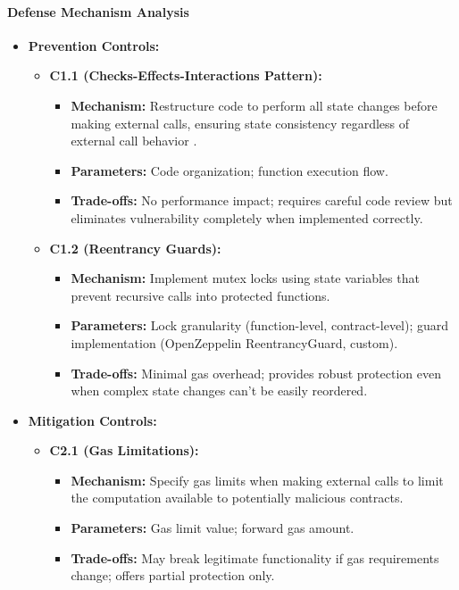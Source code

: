 \paragraph{Defense Mechanism Analysis}

\begin{itemize}
\item \textbf{Prevention Controls:}
    \begin{itemize}
    \item \textbf{C1.1 (Checks-Effects-Interactions Pattern):}
        \begin{itemize}
        \item \textbf{Mechanism:} Restructure code to perform all state changes before making external calls, ensuring state consistency regardless of external call behavior \cite{praitheeshan2019systematic}.
        \item \textbf{Parameters:} Code organization; function execution flow.
        \item \textbf{Trade-offs:} No performance impact; requires careful code review but eliminates vulnerability completely when implemented correctly.
        \end{itemize}
    
    \item \textbf{C1.2 (Reentrancy Guards):}
        \begin{itemize}
        \item \textbf{Mechanism:} Implement mutex locks using state variables that prevent recursive calls into protected functions.
        \item \textbf{Parameters:} Lock granularity (function-level, contract-level); guard implementation (OpenZeppelin ReentrancyGuard, custom).
        \item \textbf{Trade-offs:} Minimal gas overhead; provides robust protection even when complex state changes can't be easily reordered.
        \end{itemize}
    \end{itemize}

\item \textbf{Mitigation Controls:}
    \begin{itemize}
    \item \textbf{C2.1 (Gas Limitations):}
        \begin{itemize}
        \item \textbf{Mechanism:} Specify gas limits when making external calls to limit the computation available to potentially malicious contracts.
        \item \textbf{Parameters:} Gas limit value; forward gas amount.
        \item \textbf{Trade-offs:} May break legitimate functionality if gas requirements change; offers partial protection only.
        \end{itemize}
    

\end{itemize}
\end{itemize}

